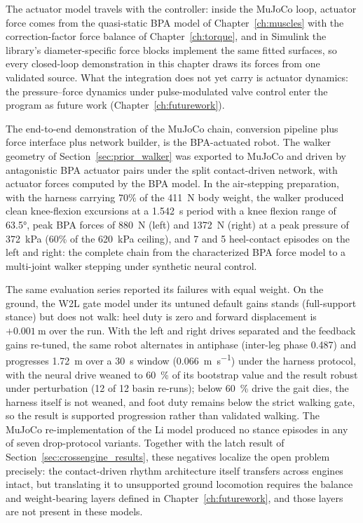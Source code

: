 The actuator model travels with the controller: inside the MuJoCo loop, actuator force comes from the quasi-static BPA model of Chapter~\ref{ch:muscles} with the correction-factor force balance of Chapter~\ref{ch:torque}, and in Simulink the library's diameter-specific force blocks implement the same fitted surfaces, so every closed-loop demonstration in this chapter draws its forces from one validated source. What the integration does not yet carry is actuator dynamics: the pressure--force dynamics under pulse-modulated valve control \citep{elzein_pressure_2025} enter the program as future work (Chapter~\ref{ch:futurework}).

The end-to-end demonstration of the MuJoCo chain, conversion pipeline plus force interface plus network builder, is the BPA-actuated robot. The walker geometry of Section~\ref{sec:prior_walker} was exported to MuJoCo and driven by antagonistic BPA actuator pairs under the split contact-driven network, with actuator forces computed by the BPA model. In the air-stepping preparation, with the harness carrying 70\% of the \qty{411}{\N} body weight, the walker produced clean knee-flexion excursions at a \qty{1.542}{\second} period with a knee flexion range of \ang{63.5}, peak BPA forces of \qty{880}{\N} (left) and \qty{1372}{\N} (right) at a peak pressure of \qty{372}{\kPa} (60\% of the \qty{620}{\kPa} ceiling), and 7 and 5 heel-contact episodes on the left and right: the complete chain from the characterized BPA force model to a multi-joint walker stepping under synthetic neural control.

The same evaluation series reported its failures with equal weight. On the ground, the W2L gate model under its untuned default gains stands (full-support stance) but does not walk: heel duty is zero and forward displacement is $+\qty{0.001}{\meter}$ over the run. With the left and right drives separated and the feedback gains re-tuned, the same robot alternates in antiphase (inter-leg phase 0.487) and progresses \qty{1.72}{\meter} over a \qty{30}{\second} window (\qty{0.066}{\metre\per\second}) under the harness protocol, with the neural drive weaned to \qty{60}{\percent} of its bootstrap value and the result robust under perturbation (12 of 12 basin re-runs); below \qty{60}{\percent} drive the gait dies, the harness itself is not weaned, and foot duty remains below the strict walking gate, so the result is supported progression rather than validated walking. The MuJoCo re-implementation of the Li model produced no stance episodes in any of seven drop-protocol variants. Together with the latch result of Section~\ref{sec:crossengine_results}, these negatives localize the open problem precisely: the contact-driven rhythm architecture itself transfers across engines intact, but translating it to unsupported ground locomotion requires the balance and weight-bearing layers defined in Chapter~\ref{ch:futurework}, and those layers are not present in these models.


